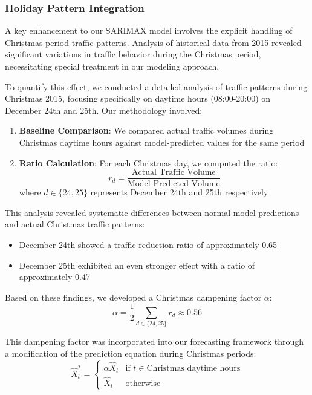 \documentclass{article}
\begin{document}
\subsubsection{Holiday Pattern Integration}
A key enhancement to our SARIMAX model involves the explicit handling of Christmas period traffic patterns. Analysis of historical data from 2015 revealed significant variations in traffic behavior during the Christmas period, necessitating special treatment in our modeling approach.

To quantify this effect, we conducted a detailed analysis of traffic patterns during Christmas 2015, focusing specifically on daytime hours (08:00-20:00) on December 24th and 25th. Our methodology involved:

\begin{enumerate}
    \item \textbf{Baseline Comparison}: We compared actual traffic volumes during Christmas daytime hours against model-predicted values for the same period
    \item \textbf{Ratio Calculation}: For each Christmas day, we computed the ratio:
    \begin{equation}
        r_d = \frac{\text{Actual Traffic Volume}}{\text{Model Predicted Volume}}
    \end{equation}
    where $d \in \{24, 25\}$ represents December 24th and 25th respectively
\end{enumerate}

This analysis revealed systematic differences between normal model predictions and actual Christmas traffic patterns:

\begin{itemize}
    \item December 24th showed a traffic reduction ratio of approximately 0.65
    \item December 25th exhibited an even stronger effect with a ratio of approximately 0.47
\end{itemize}

Based on these findings, we developed a Christmas dampening factor $\alpha$:
\begin{equation}
    \alpha = \frac{1}{2}\sum_{d \in \{24,25\}} r_d \approx 0.56
\end{equation}

This dampening factor was incorporated into our forecasting framework through a modification of the prediction equation during Christmas periods:
\begin{equation}
    \hat{X}_t^* = \begin{cases}
        \alpha \hat{X}_t & \text{if } t \in \text{Christmas daytime hours} \\
        \hat{X}_t & \text{otherwise}
    \end{cases}
\end{equation}
\end{document}
